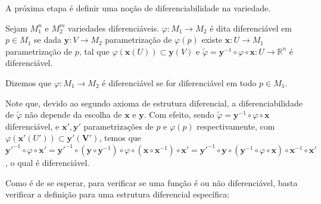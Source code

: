 A próxima etapa é definir uma noção de diferenciabilidade na variedade.
\begin{definition}
    \label{loc:2.5_:_def_2_:_diferenciabilidade}
    Sejam $M_{1}^{n}$ e $M_{2}^{m}$ variedades diferenciáveis. $\varphi:M_{1} \to M_{2}$ é dita diferenciável em $p \in M_{1}$ se dada $\mathbf{y}:V\to M_{2}$ parametrização de $\varphi(p)$ existe $\mathbf{x}:U\to M_{1}$ parametrização de $p$, tal que $\varphi(\mathbf{x}(U)) \subset \mathbf{y}(V)$ e $\tilde{\varphi}=\mathbf{y}^{-1}\circ\varphi \circ \mathbf{x}:U \to \mathbb{R}^{n}$ é diferenciável.

    Dizemos que $\varphi:M_{1}\to M_{2}$ é diferenciável se for diferenciável em todo $p \in M_{1}$.

    Note que, devido ao segundo axioma de estrutura diferencial, a diferenciabilidade de $\tilde{\varphi}$ não depende da escolha de $\mathbf{x}$ e $\mathbf{y}$. Com efeito, sendo $\tilde{\varphi}=\mathbf{y}^{-1}\circ\varphi \circ \mathbf{x}$ diferenciável, e $\mathbf{x}', \mathbf{y'}$ parametrizações de $p$ e $\varphi(p)$ respectivamente, com $\varphi(\mathbf{x'}(U')) \subset \mathbf{y'(V')}$, temos que $\mathbf{y'}^{-1} \circ \varphi \circ \mathbf{x'} = \mathbf{y'}^{-1} \circ (\mathbf{y} \circ\mathbf{y}^{-1})\circ\varphi \circ (\mathbf{x} \circ \mathbf{x}^{-1}) \circ \mathbf{x'} = \mathbf{y'}^{-1} \circ \mathbf{y} \circ (\mathbf{y}^{-1}\circ\varphi \circ \mathbf{x}) \circ \mathbf{x}^{-1} \circ \mathbf{x'}$, o qual é diferenciável.
\end{definition}
Como é de se esperar, para verificar se uma função é ou não diferenciável, basta verificar a definição para uma estrutura diferencial específica:
